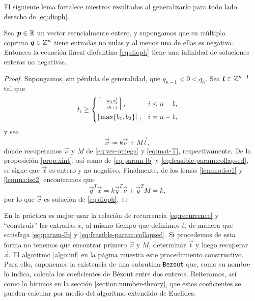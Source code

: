 El siguiente lema fortalece nuestros resultados al generalizarlo para todo lado derecho de
\eqref{eq:dioph}.
\begin{lemma}
	\label{lemma:t-existence}
	Sea $\boldsymbol{p} \in \mathbb{R}$ un vector esencialmente entero, y supongamos que su múltiplo coprimo
	$\boldsymbol{q} \in \mathbb{Z}^n$ tiene entradas no nulas y al menos una de ellas es negativa. Entonces la
	ecuación lineal diofantina \eqref{eq:dioph} tiene una infinidad de soluciones enteras no
	negativas.
\end{lemma}
\begin{proof}
	Supongamos, sin pérdida de generalidad, que $q_{n-1} < 0 < q_n$. Sea $\boldsymbol{t} \in \mathbb{Z}^{n-1}$ tal
	que
	\begin{equation*}
		t_i \geq \begin{cases}
			\left\lceil -\frac{\omega_ix_i'}{g_{i + 1}} \right\rceil, & i < n - 1, \\[0.5em]
			\left\lceil \max\lbrace b_1, b_2 \rbrace \right\rceil, & i = n - 1,
		\end{cases}
	\end{equation*}
	y sea
	\begin{equation*}
		\vec{x} \coloneq k\vec{\nu} + M\vec{t},
	\end{equation*}
	donde recuperamos $\vec{\nu}$ y $M$ de \eqref{eq:vec-omega} y \eqref{eq:mat-T}, respectivamente.
	De la proposición \ref{prop:xint}, así como de \eqref{eq:param-lb} y
	\eqref{eq:feasible-param:collapsed}, se sigue que $\vec{x}$ es entero y no negativo. Finalmente,
	de los lemas \ref{lemma:iso1} y \ref{lemma:iso2} encontramos que
	\begin{equation*}
		\vec{q}^T\vec{x} = k\vec{q}^T\vec{\nu} + \vec{q}^TM = k,
	\end{equation*}
	por lo que $\vec{x}$ es solución de \eqref{eq:dioph}.
\end{proof}

En la práctica es mejor usar la relación de recurrencia \eqref{eq:recurrence} y ``construir'' las
entradas $x_i$ al mismo tiempo que definimos $t_i$ de manera que satisfaga \eqref{eq:param-lb} y
\eqref{eq:feasible-param:collapsed}. Si procedemos de esta forma no tenemos que encontrar primero
$\vec{\nu}$ y $M$, determinar $\vec{t}$ y luego recuperar $\vec{x}$. El algoritmo \ref{algo:inf} en
la página \pageref{algo:inf} muestra este procedimiento constructivo. Para ello, suponemos la
existencia de una subrutina \texttt{Bezout} que, como su nombre lo indica, calcula los coeficientes
de Bézout entre dos enteros. Reiteramos, así como lo hicimos en la sección
\ref{section:number-theory}, que estos coeficientes se pueden calcular por medio del algoritmo
extendido de Euclides.

